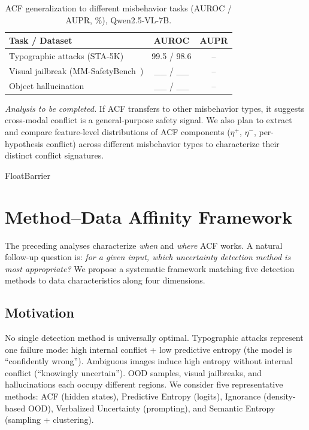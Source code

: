 \documentclass[preprint,12pt]{elsarticle}
\begin{document}
\begin{table}[t]
\centering
\caption{ACF generalization to different misbehavior tasks (AUROC / AUPR, \%), Qwen2.5-VL-7B.}
\label{tab:misbehavior}
\begin{tabular}{lcc}
\toprule
Task / Dataset & AUROC & AUPR \\
\midrule
Typographic attacks (STA-5K)              & 99.5 / 98.6 & -- \\
Visual jailbreak (MM-SafetyBench~\cite{liu2024mm}) & \_\_ / \_\_ & -- \\
Object hallucination~\cite{huang2025visual} & \_\_ / \_\_ & -- \\
\midrule
\end{tabular}
\end{table}

\textit{Analysis to be completed.} If ACF transfers to other misbehavior types, it suggests cross-modal conflict is a general-purpose safety signal. We also plan to extract and compare feature-level distributions of ACF components ($\eta^+$, $\eta^-$, per-hypothesis conflict) across different misbehavior types to characterize their distinct conflict signatures.

FloatBarrier
\section{Method--Data Affinity Framework}
\label{sec:affinity}

The preceding analyses characterize \emph{when} and \emph{where} ACF works. A natural follow-up question is: \emph{for a given input, which uncertainty detection method is most appropriate?} We propose a systematic framework matching five detection methods to data characteristics along four dimensions.

\subsection{Motivation}

No single detection method is universally optimal. Typographic attacks represent one failure mode: high internal conflict + low predictive entropy (the model is ``confidently wrong''). Ambiguous images induce high entropy without internal conflict (``knowingly uncertain''). OOD samples, visual jailbreaks, and hallucinations each occupy different regions. We consider five representative methods: ACF (hidden states), Predictive Entropy (logits), Ignorance (density-based OOD), Verbalized Uncertainty (prompting), and Semantic Entropy (sampling + clustering).
\end{document}
